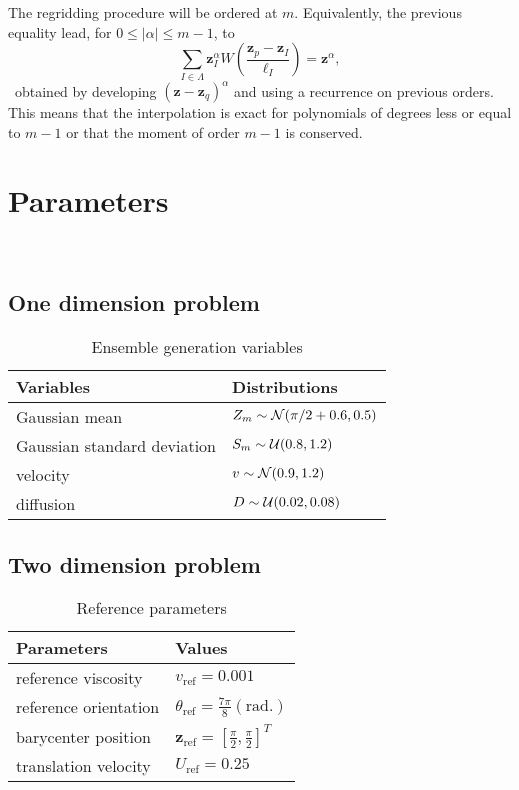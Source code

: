 The regridding procedure will be ordered at $m$. Equivalently, the previous equality lead, for $0 \leq |\alpha| \leq m - 1$, to
\begin{equation*}
    \sum_{I \in \Lambda} \bm z_I^\alpha W \left(\frac{\bm z_p - \bm z_I}{\ell_I} \right) = \bm z^\alpha,
\end{equation*}~obtained by developing ${(\bm z-\bm z_q)}^\alpha$ and using a recurrence on previous orders. This means that the interpolation is exact for polynomials of degrees less or equal to $m-1$ or that the moment of order $m-1$ is conserved.

\section{Parameters}~\label{appendix:simulation-parameters}

\subsection{One dimension problem}
\begin{table}[htbp]
    \centering
    \caption{Ensemble generation variables}
    \begin{tabular}[t]{|l|l|}
        \hline
        Variables                   & Distributions                              \\
        \hline
        Gaussian mean               & $Z_m \sim  \mathcal{N}(\pi/2 + 0.6, 0.5)$ \\
        Gaussian standard deviation & $S_m \sim\mathcal{U}(0.8, 1.2)$       \\
        velocity                    & $v \sim \mathcal{N}(0.9, 1.2)$        \\
        diffusion                   & $D \sim \mathcal{U}(0.02, 0.08)$          \\
        \hline
    \end{tabular}
    \label{tab:ens_gen_1d}
\end{table}

\subsection{Two dimension problem}
\begin{table}[htbp]
    \centering
    \caption{Reference parameters}
    \begin{tabular}[t]{|l|l|}
        \hline
        Parameters            & Values                                                       \\
        \hline
        reference viscosity   & $v_{\text{ref}} = 0.001$                                     \\
        reference orientation & $\theta_{\text{ref}}  = \frac{7 \pi}{8} (\text{rad.})$       \\
        barycenter position   & $\bm{z}_{\text{ref}} = \left[\frac\pi2, \frac\pi2 \right]^T$ \\
        translation velocity  & $U_{\text{ref}} = 0.25$                                      \\
        \hline
    \end{tabular}
    \label{tab:ref}
\end{table}


